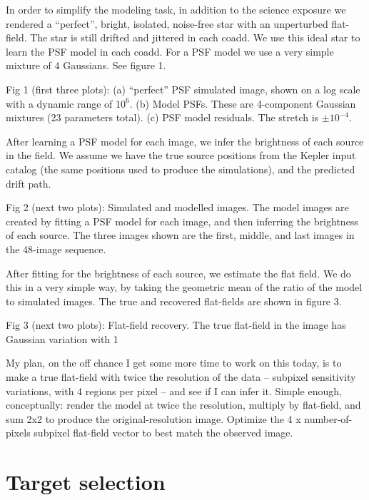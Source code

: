 \documentclass[letterpaper,12pt,preprint]{aastex}
\begin{document}
In order to simplify the modeling task, in addition to the science exposure we rendered a ``perfect'', bright, isolated, noise-free star with an unperturbed flat-field.  The star is still drifted and jittered in each coadd.  We use this ideal star to learn the PSF model in each coadd.  For a PSF model we use a very simple mixture of 4 Gaussians.  See figure 1.

Fig 1 (first three plots): (a) ``perfect'' PSF simulated image, shown on a log scale with a dynamic range of $10^6$. (b) Model PSFs.  These are 4-component Gaussian mixtures (23 parameters total).  (c) PSF model residuals.  The stretch is $\pm 10^{-4}$.

After learning a PSF model for each image, we infer the brightness of each source in the field.  We assume we have the true source positions from the Kepler input catalog (the same positions used to produce the simulations), and the predicted drift path.

Fig 2 (next two plots): Simulated and modelled images.  The model images are created by fitting a PSF model for each image, and then inferring the brightness of each source.  The three images shown are the first, middle, and last images in the 48-image sequence.

After fitting for the brightness of each source, we estimate the flat field.  We do this in a very simple way, by taking the geometric mean of the ratio of the model to simulated images.  The true and recovered flat-fields are shown in figure 3.

Fig 3 (next two plots): Flat-field recovery.  The true flat-field in the image has Gaussian variation with 1%

My plan, on the off chance I get some more time to work on this today, is to make a true flat-field with twice the resolution of the data -- subpixel sensitivity variations, with 4 regions per pixel -- and see if I can infer it. Simple enough, conceptually: render the model at twice the resolution, multiply by flat-field, and sum 2x2 to produce the original-resolution image.  Optimize the 4 x number-of-pixels subpixel flat-field vector to best match the observed image.

\section{Target selection}\label{sec:target}
\end{document}
